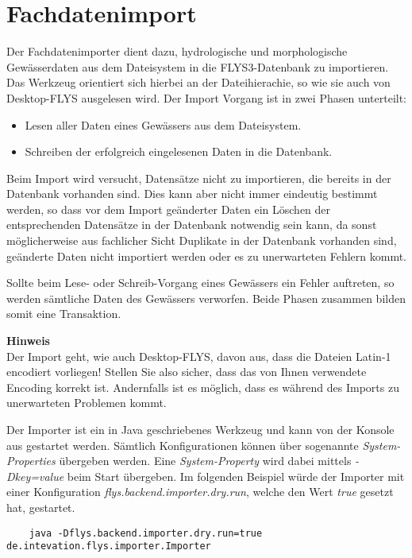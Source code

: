 \section{Fachdatenimport}

Der Fachdatenimporter dient dazu, hydrologische und morphologische Gewässerdaten
aus dem Dateisystem in die FLYS3-Datenbank zu importieren. Das Werkzeug
orientiert sich hierbei an der Dateihierachie, so wie sie auch von Desktop-FLYS
ausgelesen wird. Der Import Vorgang ist in zwei Phasen unterteilt:

\begin{itemize}
    \item Lesen aller Daten eines Gewässers aus dem Dateisystem.
    \item Schreiben der erfolgreich eingelesenen Daten in die Datenbank.
\end{itemize}

Beim Import wird versucht, Datensätze nicht zu importieren,
die bereits in der Datenbank vorhanden sind.
Dies kann aber nicht immer eindeutig bestimmt werden,
so dass vor dem Import geänderter Daten
ein Löschen der entsprechenden Datensätze in der Datenbank notwendig sein kann,
da sonst möglicherweise aus fachlicher Sicht Duplikate in der Datenbank vorhanden sind,
geänderte Daten nicht importiert werden
oder es zu unerwarteten Fehlern kommt.

Sollte beim Lese- oder Schreib-Vorgang eines Gewässers ein Fehler auftreten, so
werden sämtliche Daten des Gewässers verworfen. Beide Phasen zusammen bilden
somit eine Transaktion.

\textbf{Hinweis}
\\Der Import geht, wie auch Desktop-FLYS, davon aus, dass die Dateien Latin-1
encodiert vorliegen! Stellen Sie also sicher, dass das von Ihnen verwendete
Encoding korrekt ist. Andernfalls ist es möglich, dass es während des Imports zu
unerwarteten Problemen kommt.

Der Importer ist ein in Java geschriebenes Werkzeug und kann von der Konsole aus
gestartet werden. Sämtlich Konfigurationen können über sogenannte
\textit{System-Properties} übergeben werden. Eine \textit{System-Property} wird
dabei mittels \textit{-Dkey=value} beim Start übergeben. Im folgenden Beispiel
würde der Importer mit einer Konfiguration \textit{flys.backend.importer.dry.run},
welche den Wert \textit{true} gesetzt hat, gestartet.

\begin{lstlisting}
    java -Dflys.backend.importer.dry.run=true de.intevation.flys.importer.Importer
\end{lstlisting}

